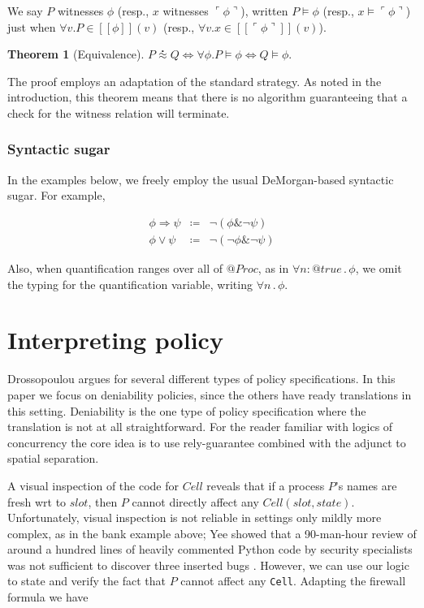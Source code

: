 \documentclass[]{amsart}
\makeatletter
\newcommand{\ldb}{[\![}
\newcommand{\rdb}{]\!]}
\newcommand{\lpquote}{\ulcorner}
\newcommand{\rpquote}{\urcorner}
\newcommand{\quotep}[1]{@#1}
\newcommand{\meaningof}[1]{\ldb #1 \rdb}
\newcommand{\QProc}{\quotep{\mathbin{Proc}}}
\newcommand{\defneqls}{\coloneqq}
\newcommand{\wbbisim}{\stackrel{\centerdot}{\approx}} %
\newcommand{\ptrue}{\mathbin{true}}
\newcommand{\pquotep}[1]{\lpquote #1 \rpquote}
\newcommand{\pquant}[3]{\forall #1 \mathbin{:} #2 \mathbin{.} #3}
\newcommand{\pquantuntyped}[2]{\forall #1 \mathbin{.} #2}
\newcommand{\riff}{\Leftrightarrow}
\newtheorem{thm}{Theorem}[subsection]
\theoremstyle{definition}
\theoremstyle{remark}
\numberwithin{equation}{subsection}
\makeatother
\begin{document}
We say $P$ witnesses $\phi$ (resp., $x$ witnesses $\pquotep{\phi}$),
written $P \models \phi$ (resp., $x \models \pquotep{\phi}$) just when
$\forall v . P \in \meaningof{\phi}(v)$ (resp., $\forall v . x \in \meaningof{\pquotep{\phi}}(v)$).

\begin{thm}[Equivalence]
	$P \wbbisim Q \riff \forall \phi . P \models \phi \riff Q \models \phi .$
\end{thm}

The proof employs an adaptation of the standard strategy. As noted in
the introduction, this theorem means that there is no algorithm
guaranteeing that a check for the witness relation will terminate.

\subsubsection{Syntactic sugar }

In the examples below, we freely employ the usual DeMorgan-based
syntactic sugar. For example,

\begin{eqnarray}
	\phi \Rightarrow \psi & \defneqls & \neg ( \phi \& \neg \psi ) \nonumber\\
	\phi \vee \psi & \defneqls & \neg ( \neg \phi \& \neg \psi ) \nonumber
\end{eqnarray}

Also, when quantification ranges over all of $\QProc$, as in
$\pquant{n}{\quotep{\ptrue}}{\phi}$, we omit the typing for the
quantification variable, writing $\pquantuntyped{n}{\phi}$.

\section{Interpreting policy}

Drossopoulou \cite{Drossopoulou:2013:NCP:2489804.2489811} argues for several different types of policy
specifications. In this paper we focus on deniability policies, since the
others have ready translations in this setting. Deniability is the one
type of policy specification where the translation is not at all
straightforward. For the reader familiar with logics of concurrency the
core idea is to use rely-guarantee combined with the adjunct to
spatial separation.

A visual inspection of the code for $Cell$ reveals that if a
process $P$’s names are fresh wrt to $slot$, then $P$ cannot
directly affect any $Cell( slot, state )$. Unfortunately, 
visual inspection is not reliable in settings only mildly more 
complex, as in the bank example above; Yee showed that a 90-man-hour
review of around a hundred lines of heavily commented Python code 
by security specialists was not sufficient to discover three 
inserted bugs \cite[Section 7]{Pvote}. 
However, we can use our logic to state and verify the fact that $P$
cannot affect any {\tt Cell}. Adapting the firewall formula we have
\end{document}
